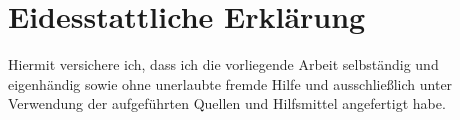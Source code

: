 \chapter*{\LARGE Eidesstattliche Erklärung}
Hiermit versichere ich, dass ich die vorliegende Arbeit selbständig und eigenhändig sowie
ohne unerlaubte fremde Hilfe und ausschließlich unter Verwendung der aufgeführten
Quellen und Hilfsmittel angefertigt habe.


\vspace{30mm}
\hfill{}
\newpage